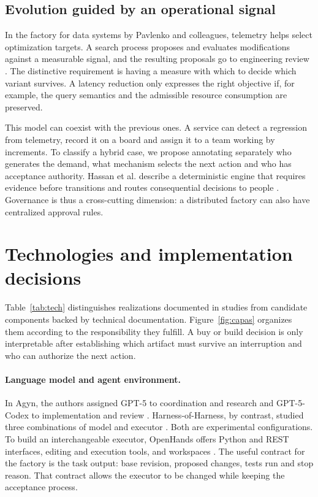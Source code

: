 \documentclass[11pt,a4paper]{article}
\begin{document}
\subsection{Evolution guided by an operational signal}
In the factory for data systems by Pavlenko and colleagues, telemetry helps select optimization targets. A search process proposes and evaluates modifications against a measurable signal, and the resulting proposals go to engineering review \citep{data}. The distinctive requirement is having a measure with which to decide which variant survives. A latency reduction only expresses the right objective if, for example, the query semantics and the admissible resource consumption are preserved.

This model can coexist with the previous ones. A service can detect a regression from telemetry, record it on a board and assign it to a team working by increments. To classify a hybrid case, we propose annotating separately who generates the demand, what mechanism selects the next action and who has acceptance authority. Hassan et al. describe a deterministic engine that requires evidence before transitions and routes consequential decisions to people \citep{hassan}. Governance is thus a cross-cutting dimension: a distributed factory can also have centralized approval rules.

\section{Technologies and implementation decisions}
Table~\ref{tab:tech} distinguishes realizations documented in studies from candidate components backed by technical documentation. Figure~\ref{fig:capas} organizes them according to the responsibility they fulfill. A buy or build decision is only interpretable after establishing which artifact must survive an interruption and who can authorize the next action.

\paragraph{Language model and agent environment.}
In Agyn, the authors assigned GPT-5 to coordination and research and GPT-5-Codex to implementation and review \citep[section 4.1]{agyn}. Harness-of-Harness, by contrast, studied three combinations of model and executor \citep[section 4.1]{hoh}. Both are experimental configurations. To build an interchangeable executor, OpenHands offers Python and REST interfaces, editing and execution tools, and workspaces \citep{openhands}. The useful contract for the factory is the task output: base revision, proposed changes, tests run and stop reason. That contract allows the executor to be changed while keeping the acceptance process.
\end{document}
